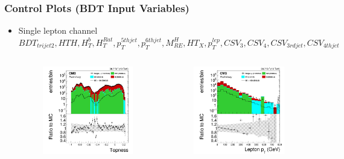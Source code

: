 \documentclass{beamer}
\begin{document}
\begin{frame}
\frametitle{Control Plots (BDT Input Variables)}
\begin{itemize}
	\item {\small Single lepton channel}
	{\tiny $BDT_{trijet2}, HTH, H_{T}^{b}, H_{T}^{Rat}, p_{T}^{5th jet}, p_{T}^{6th jet}, M_{RE}^{H}, HT_{X}, p_{T}^{lep}, CSV_{3}, CSV_{4}, CSV_{3rdjet}, CSV_{4thjet}$}
	\vspace{-12pt}
	\begin{columns}
		 \begin{figure} \includegraphics[scale=0.08]{multitopness.png} \end{figure}
		 \begin{figure} \includegraphics[scale=0.08]{leptonpt.png} \end{figure}

\end{columns}
\end{itemize}
\end{frame}
\end{document}
